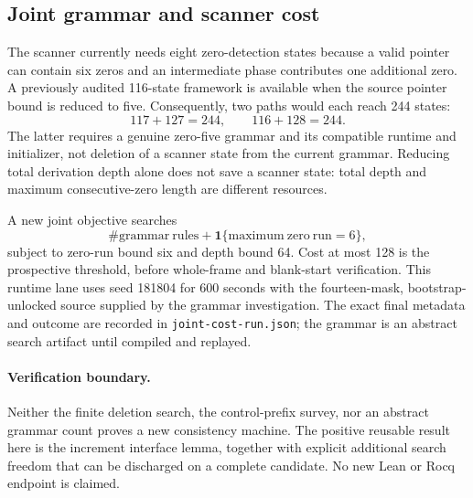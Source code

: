 \subsection{Joint grammar and scanner cost}

The scanner currently needs eight zero-detection states because a valid
pointer can contain six zeros and an intermediate phase contributes one
additional zero. A previously audited 116-state framework is available
when the source pointer bound is reduced to five. Consequently, two paths
would each reach 244 states:
\[
117+127=244,\qquad116+128=244.
\]
The latter requires a genuine zero-five grammar and its compatible runtime
and initializer, not deletion of a scanner state from the current grammar.
Reducing total derivation depth alone does not save a scanner state: total
depth and maximum consecutive-zero length are different resources.

A new joint objective searches
\[
\#\mathrm{grammar\ rules}
  +\mathbf1\{\mathrm{maximum\ zero\ run}=6\},
\]
subject to zero-run bound six and depth bound 64. Cost at most 128 is the
prospective threshold, before whole-frame and blank-start verification.
This runtime lane uses seed 181804 for 600 seconds with the fourteen-mask,
bootstrap-unlocked source supplied by the grammar investigation. The exact
final metadata and outcome are recorded in \texttt{joint-cost-run.json};
the grammar is an abstract search artifact until compiled and replayed.

\paragraph{Verification boundary.}
Neither the finite deletion search, the control-prefix survey, nor an
abstract grammar count proves a new consistency machine. The positive
reusable result here is the increment interface lemma, together with
explicit additional search freedom that can be discharged on a complete
candidate. No new Lean or Rocq endpoint is claimed.
